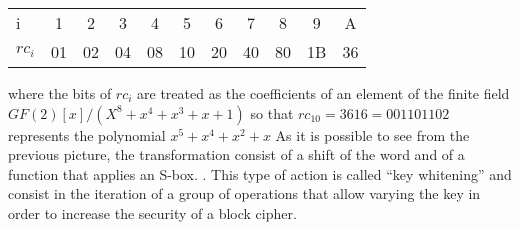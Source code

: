 \documentclass{article}
\begin{document}
\begin{table}[]
    \centering
    \begin{tabular}{|l*{10}{|c}|}
    \hline
        i     & 1  & 2  & 3  & 4  & 5  & 6  & 7  & 8  & 9  & A \\
      $rc_i$  & 01 & 02 & 04 & 08 &	10 & 20 & 40 & 80 &	1B & 36\\
    \hline     
    \end{tabular}
\end{table}
where the bits of $rc_i$ are treated as the coefficients of an element of the finite field $GF(2)[x]/(X^8+x^4+x^3+x+1)$ so that $rc_{10}=3616=001101102$ represents the polynomial $x^5+x^4+x^2+x$
As it is possible to see from the previous picture, the transformation consist of a shift of the word and of a function that applies an S-box. .
This type of action is called “key whitening” and consist in the iteration of a group of operations that allow varying the key in order to increase the security of a block cipher.
\end{document}
